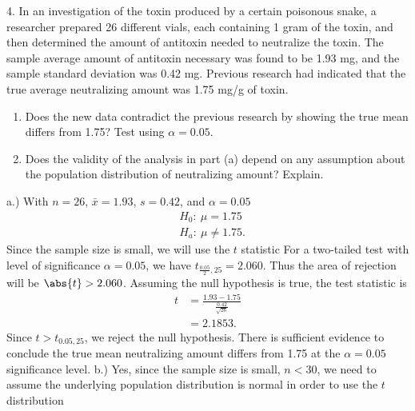 \documentclass{report}
\begin{document}
\pagebreak \bigbreak \noindent 
\begin{mdframed}
4. In an investigation of the toxin produced by a certain poisonous snake, a researcher prepared 26 different vials, each containing 1 gram of the toxin, and then determined the amount of antitoxin needed to neutralize the toxin. The sample average amount of antitoxin necessary was found to be 1.93 mg, and the sample standard deviation was 0.42 mg. Previous research had indicated that the true average neutralizing amount was 1.75 mg/g of toxin.
    \begin{enumerate}[label=(\alph*)]
        \item Does the new data contradict the previous research by showing the true mean differs from 1.75? Test using $\alpha = 0.05$.
        \item Does the validity of the analysis in part (a) depend on any assumption about the population distribution of neutralizing amount? Explain.
    \end{enumerate}
\end{mdframed}
\bigbreak \noindent 
a.) With $n=26$, $\bar{x} = 1.93$, $s=0.42$, and $\alpha=0.05$
\begin{align*}
    &H_{0}:\ \mu = 1.75 \\
    &H_{a}:\ \mu \ne 1.75
.\end{align*}
\bigbreak \noindent 
Since the sample size is small, we will use the $t$ statistic
\bigbreak \noindent 
For a two-tailed test with level of significance $\alpha=0.05$, we have $t_{\frac{0.05}{2}, 25} = 2.060$. Thus the area of rejection will be $\abs{t} > 2.060$. Assuming the null hypothesis is true, the test statistic is
\begin{align*}
    t &= \frac{1.93-1.75}{\frac{0.42}{\sqrt{26}}} \\
    &=2.1853
.\end{align*}
\bigbreak \noindent 
Since $t > t_{0.05, 25}$, we reject the null hypothesis. There is sufficient evidence to conclude the true mean neutralizing amount differs from 1.75 at the $\alpha=0.05$ significance level.
\bigbreak \noindent 
b.) Yes, since the sample size is small, $n < 30$, we need to assume the underlying population distribution is normal in order to use the $t$ distribution
\end{document}
